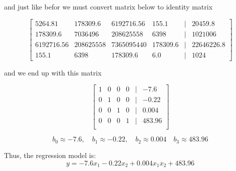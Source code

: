 \documentclass{article}
\begin{document}
	and just like befor we must convert matrix below to identity matrix
	
	\[
	\begin{bmatrix}
		5264.81 & 178309.6 & 6192716.56 & 155.1 & \vert & 20459.8 \\
		178309.6 & 7036496 & 208625558 & 6398 & \vert & 1021006 \\
		6192716.56 & 208625558 & 7365095440 & 178309.6 & \vert & 22646226.8 \\
		155.1 & 6398 & 178309.6 & 6.0 & \vert & 1024
	\end{bmatrix}
	\]
	
	and we end up with this matrix
	
	\[
	\begin{bmatrix}
		1 & 0 & 0 & 0 & \vert & -7.6 \\
		0 & 1 & 0 & 0 & \vert & -0.22 \\
		0 & 0 & 1 & 0 & \vert & 0.004 \\
		0 & 0 & 0 & 1 & \vert & 483.96 \\
	\end{bmatrix}
	\]
	
	\[
	b_0 \approx -7.6, \quad b_1 \approx -0.22, \quad b_2 \approx 0.004 \quad b_3 \approx 483.96
	\]
	
	Thus, the regression model is:
	\[
	y = - 7.6 x_1 - 0.22 x_2 + 0.004 x_1 x_2 + 483.96
	\]
	
	
\end{document}

